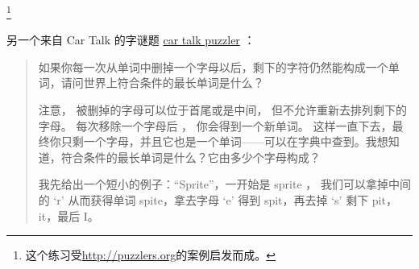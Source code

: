 {\begin{exercise}
\footnote{这个练习受\href{http://puzzlers.org}{http://puzzlers.org}的案例启发而成。}

\end{exercise}


\begin{exercise}


另一个来自 Car Talk 的字谜题 \href{http://www.cartalk.com/content/puzzlers}{car talk puzzler} ：

\begin{quote}

如果你每一次从单词中删掉一个字母以后，剩下的字符仍然能构成一个单词，请问世界上符合条件的最长单词是什么？

注意， 被删掉的字母可以位于首尾或是中间， 但不允许重新去排列剩下的字母。  
每次移除一个字母后 ， 你会得到一个新单词。  
这样一直下去，最终你只剩一个字母，并且它也是一个单词——可以在字典中查到。我想知道，符合条件的最长单词是什么？它由多少个字母构成？

我先给出一个短小的例子：``Sprite''，一开始是 sprite ， 我们可以拿掉中间的 `r' 从而获得单词 spite，拿去字母 `e' 得到 spit，再去掉 `s' 剩下 pit， it，最后 I。
\end{quote}

 



\end{exercise}}
